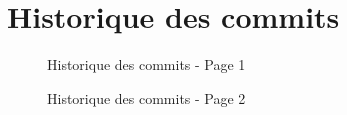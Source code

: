 \documentclass [a4 paper,11pt]{report}
\begin{document}


\newpage{}




\section{Historique des commits}

\begin{center}

  \begin{figure}[h!]
  \noindent{}
  \caption{Historique des commits - Page 1}
  \end{figure}

  \begin{figure}[h!]
  \noindent{}
  \caption{Historique des commits - Page 2}
  \end{figure}


\end{center}
\end{document}
